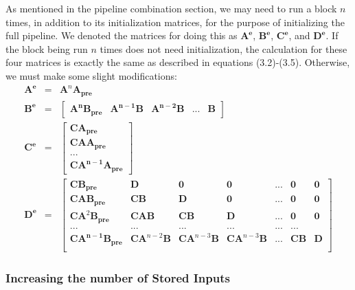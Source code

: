    As mentioned in the pipeline combination section, we may need
to run a block $n$ times, in addition to its initialization
matrices, for the purpose of initializing the full pipeline. We
denoted the matrices for doing this as $\mathbf{A^e}$,
$\mathbf{B^e}$, $\mathbf{C^e}$, and $\mathbf{D^e}$. If the block
being run $n$ times does not need initialization, the calculation
for these four matrices is exactly the same as described in
equations (3.2)-(3.5). Otherwise, we must make some slight
modifications:
\begin{eqnarray}
\mathbf{A^e} & = & \mathbf{A}^n \mathbf{A_{pre}} \\
\mathbf{B^e} & = & \left [ \begin{array} {ccccc} \mathbf{A^n}
\mathbf{B_{pre}} & \mathbf{A^{n-1}} \mathbf{B} & \mathbf{A^{n-2}}
\mathbf{B} & ... & \mathbf{B}
\end{array} \right ] \\
\mathbf{C^e} & = & \left [ \begin{array} {c} \mathbf{C} \mathbf{A_{pre}} \\
\mathbf{C} \mathbf{A} \mathbf{A_{pre}} \\ ... \\
\mathbf{C} \mathbf{A^{n-1}} \mathbf{A_{pre}} \end{array} \right ] \\
\mathbf{D^e} & = & \left [ \begin{array} {cccccccc} \mathbf{C}
\mathbf{B_{pre}} & \mathbf{D} & \mathbf{0} &
\mathbf{0} & ... & \mathbf{0} & \mathbf{0} \\
\mathbf{C} \mathbf{A} \mathbf{B_{pre}} & \mathbf{CB} &
\mathbf{D} & \mathbf{0} & ... & \mathbf{0} & \mathbf{0} \\
\mathbf{C} \mathbf{A}^2 \mathbf{B_{pre}} & \mathbf{CAB} &
\mathbf{CB} & \mathbf{D} & ... & \mathbf{0} & \mathbf{0} \\
... & ... & ... & ... & ... & ... \\
\mathbf{C} \mathbf{A^{n-1}} \mathbf{B_{pre}} & \mathbf{CA}^{n-2}
\mathbf{B} & \mathbf{CA}^{n-3} \mathbf{B} &
\mathbf{CA}^{n-3} \mathbf{B} & ... & \mathbf{CB} & \mathbf{D} \\
 \end{array} \right ]
\end{eqnarray}

\subsubsection{Increasing the number of Stored Inputs}

